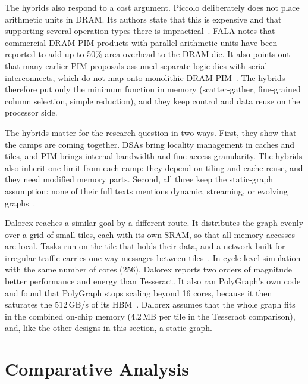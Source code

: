 \documentclass[journal,onecolumn]{IEEEtran}
\begin{document}
The hybrids also respond to a cost argument. Piccolo deliberately does not place arithmetic units in DRAM. Its authors state that this is expensive and that supporting several operation types there is impractical~\cite{shin2025piccolo}. FALA notes that commercial DRAM-PIM products with parallel arithmetic units have been reported to add up to 50\% area overhead to the DRAM die. It also points out that many earlier PIM proposals assumed separate logic dies with serial interconnects, which do not map onto monolithic DRAM-PIM~\cite{shin2025fala}. The hybrids therefore put only the minimum function in memory (scatter-gather, fine-grained column selection, simple reduction), and they keep control and data reuse on the processor side.

The hybrids matter for the research question in two ways. First, they show that the camps are coming together. DSAs bring locality management in caches and tiles, and PIM brings internal bandwidth and fine access granularity. The hybrids also inherit one limit from each camp: they depend on tiling and cache reuse, and they need modified memory parts. Second, all three keep the static-graph assumption: none of their full texts mentions dynamic, streaming, or evolving graphs~\cite{shin2025piccolo,shin2025fala,yenimol2026cograf}.

Dalorex reaches a similar goal by a different route. It distributes the graph evenly over a grid of small tiles, each with its own SRAM, so that all memory accesses are local. Tasks run on the tile that holds their data, and a network built for irregular traffic carries one-way messages between tiles~\cite{orenesvera2023dalorex}. In cycle-level simulation with the same number of cores (256), Dalorex reports two orders of magnitude better performance and energy than Tesseract. It also ran PolyGraph's own code and found that PolyGraph stops scaling beyond 16 cores, because it then saturates the 512\,GB/s of its HBM~\cite{orenesvera2023dalorex}. Dalorex assumes that the whole graph fits in the combined on-chip memory (4.2\,MB per tile in the Tesseract comparison), and, like the other designs in this section, a static graph.

\section{Comparative Analysis}\label{sec:analysis}
\end{document}
